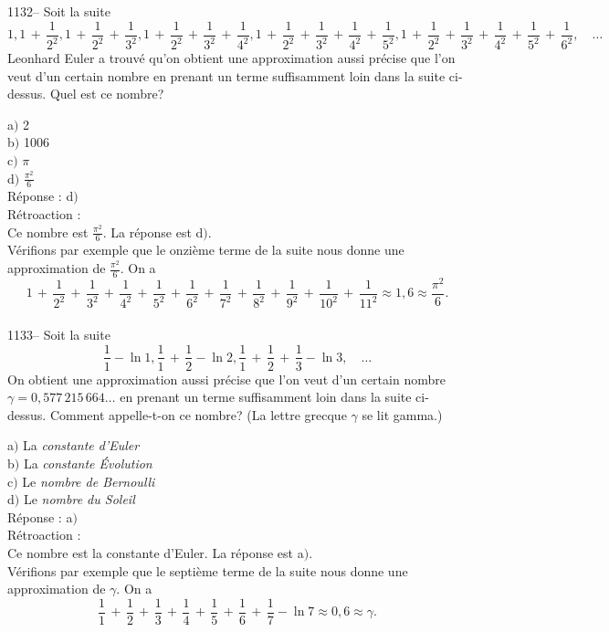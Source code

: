 ﻿\documentclass[letterpaper, 12pt]{article}
\begin{document}
1132-- Soit la suite
$$\displaystyle{1,1\,+\,\frac1{2^2},1\,+\,\frac1{2^2}\,+\,\frac1{3^2},1\,+\,\frac1{2^2}\,+\,\frac1{3^2}\,+\,\frac1{4^2},
1\,+\,\frac1{2^2}\,+\,\frac1{3^2}\,+\,\frac1{4^2}\,+\,\frac1{5^2},
1\,+\,\frac1{2^2}\,+\,\frac1{3^2}\,+\,\frac1{4^2}\,+\,\frac1{5^2}\,+\,\frac1{6^2}},\quad\ldots$$
Leonhard Euler a trouv\'e qu'on obtient une approximation aussi
pr\'ecise que l'on veut d'un certain nombre en prenant un terme
suffisamment loin dans la suite ci-dessus. Quel est ce nombre?

a$)$ 2\\
b$)$ 1006 \\
c$)$ $\pi$ \\
d$)$ $\frac{\pi^2}6$\\

R\'eponse : d$)$\\

R\'etroaction : \\
Ce nombre est $\frac{\pi^2}6$. La r\'eponse est d$)$.\\
V\'erifions
par exemple que le onzi\`eme terme de la suite nous donne une
approximation de $\frac{\pi^2}6$. On a
$$\displaystyle{1\,+\,\frac1{2^2}\,+\,\frac1{3^2}\,+\,\frac1{4^2}\,+\,\frac1{5^2}\,+\,\frac1{6^2}\,+\,\frac1{7^2}
\,+\,\frac1{8^2}\,+\,\frac1{9^2}\,+\,\frac1{10^2}\,+\,\frac1{11^2}\approx1,6\approx\frac{\pi^2}6}.$$\\

1133-- Soit la suite
$$\displaystyle{\frac11-\ln1,\frac11\,+\,\frac12-\ln2,\frac11\,+\,\frac12\,+\,\frac13-\ln3},\quad\ldots$$
On obtient une approximation aussi pr\'ecise que l'on veut d'un
certain nombre $\gamma=0,577\,215\,664\ldots$ en prenant un terme
suffisamment loin dans la suite ci-dessus. Comment appelle-t-on ce
nombre? (La lettre grecque $\gamma$ se lit gamma.)

a$)$ La {\sl constante d'Euler}\\
b$)$ La {\sl constante \'Evolution} \\
c$)$ Le {\sl nombre de Bernoulli} \\
d$)$ Le {\sl nombre du Soleil}\\

R\'eponse : a$)$\\

R\'etroaction : \\
Ce nombre est la constante d'Euler. La r\'eponse est
a$)$.\\
V\'erifions par exemple que le septi\`eme terme de la suite
nous donne une approximation de $\gamma$. On a
$$\displaystyle{\frac11\,+\,\frac12\,+\,\frac13\,+\,\frac14\,+\,\frac15\,+\,\frac16\,+\,\frac17-\ln7}
\approx0,6\approx\gamma.$$\\
\end{document}
